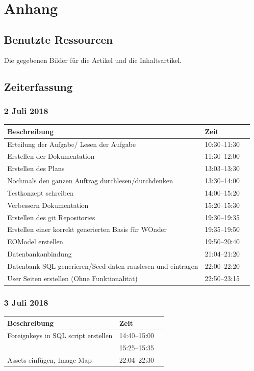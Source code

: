 \documentclass[a4paper, 11pt]{article}
\begin{document}
\section{Anhang}

\subsection{Benutzte Ressourcen}

Die gegebenen Bilder für die Artikel und die Inhaltsartikel.

\subsection{Zeiterfassung}

\subsubsection{2 Juli 2018}

\begin{tabular}{llr}
\toprule
Beschreibung & Zeit \\
\midrule
Erteilung der Aufgabe/ Lesen der Aufgabe & 10:30--11:30 \\
Erstellen der Dokumentation & 11:30--12:00 \\
Erstellen des Plans & 13:03--13:30 \\
Nochmals den ganzen Auftrag durchlesen/durchdenken & 13:30--14:00 \\
Testkonzept schreiben & 14:00--15:20 \\
Verbessern Dokumentation & 15:20--15:30 \\
Erstellen des git Repositories & 19:30--19:35 \\
Erstellen einer korrekt generierten Basis  für WOnder & 19:35--19:50 \\
EOModel erstellen & 19:50--20:40 \\
Datenbankanbindung & 21:04--21:20 \\
Datenbank SQL generieren/Seed daten rauslesen und eintragen & 22:00--22:20 \\
User Seiten erstellen (Ohne Funktionalität) & 22:50--23:15 \\
\bottomrule
\end{tabular}

\subsubsection{3 Juli 2018}

\begin{tabular}{llr}
\toprule
Beschreibung & Zeit \\
\midrule
Foreignkeys in SQL script erstellen & 14:40--15:00 \\
 & 15:25--15:35 \\
Assets einfügen, Image Map & 22:04--22:30 \\
\bottomrule
\end{tabular}
\end{document}
